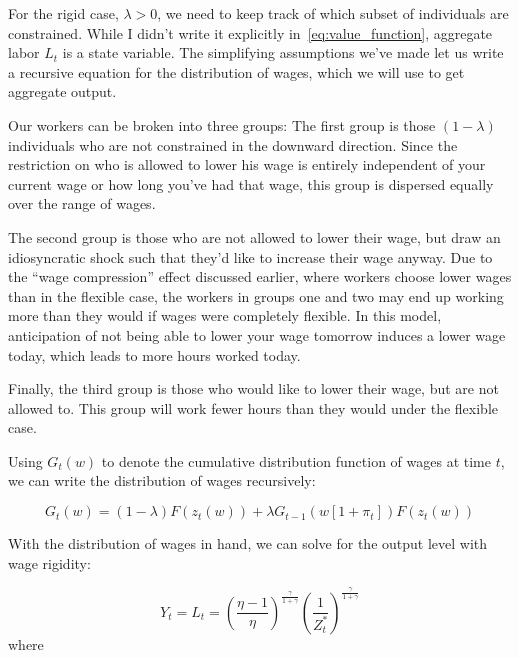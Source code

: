 \documentclass[12pt,a4paper]{scrartcl}            %
\begin{document}
For the rigid case, $\lambda > 0$, we need to keep track of which subset of individuals are constrained.
While I didn't write it explicitly in~\eqref{eq:value_function}, aggregate labor $L_t$ is a state variable.
The simplifying assumptions we've made let us write a recursive equation for the distribution of wages, which we will use to get aggregate output.

Our workers can be broken into three groups:
The first group is those $(1 - \lambda)$ individuals who are not constrained in the downward direction.
Since the restriction on who is allowed to lower his wage is entirely independent of your current wage or how long you've had that wage, this group is dispersed equally over the range of wages.

The second group is those who are not allowed to lower their wage, but draw an idiosyncratic shock such that they'd like to increase their wage anyway.
Due to the ``wage compression'' effect discussed earlier, where workers choose lower wages than in the flexible case, the workers in groups one and two may end up working more than they would if wages were completely flexible.
In this model, anticipation of not being able to lower your wage tomorrow induces a lower wage today, which leads to more hours worked today.

Finally, the third group is those who would like to lower their wage, but are not allowed to.
This group will work fewer hours than they would under the flexible case.

Using $G_t(w)$ to denote the cumulative distribution function of wages at time $t$, we can write the distribution of wages recursively:

\begin{equation}
    \label{eq:wage_distribution}
    G_t(w) = (1 - \lambda) F(z_t(w)) + \lambda G_{t-1}\left(w[1 + \pi_t]\right)F(z_t(w))
\end{equation}

With the distribution of wages in hand, we can solve for the output level with wage rigidity:

\begin{equation}
    \label{eq:output_rigid}
    Y_t = L_t = \left(\frac{\eta - 1}{\eta} \right)^{\frac{\gamma}{1 + \gamma}}\left( \frac{1}{Z_t^*} \right)^{\frac{\gamma}{1 + \gamma}}
\end{equation}
%
where
\end{document}
